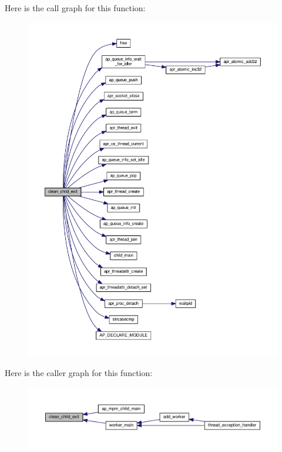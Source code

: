 Here is the call graph for this function\+:
\nopagebreak
\begin{figure}[H]
\begin{center}
\leavevmode
\includegraphics[width=350pt]{group__APACHE__MPM__WINNT_ga0c853525f284a08a7805d36e6eac77ce_cgraph}
\end{center}
\end{figure}




Here is the caller graph for this function\+:
\nopagebreak
\begin{figure}[H]
\begin{center}
\leavevmode
\includegraphics[width=350pt]{group__APACHE__MPM__WINNT_ga0c853525f284a08a7805d36e6eac77ce_icgraph}
\end{center}
\end{figure}


